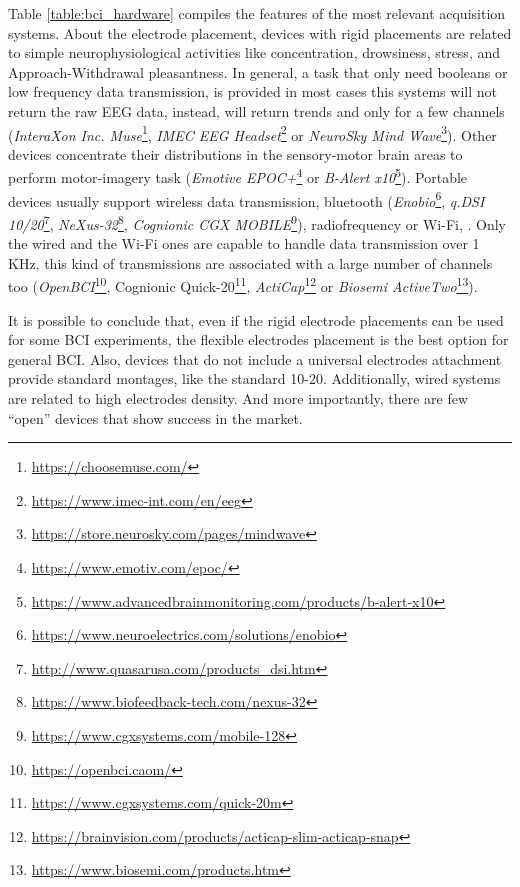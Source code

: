 Table \ref{table:bci_hardware} compiles the features of the most relevant acquisition systems. About the electrode placement, devices with rigid placements are related to simple neurophysiological activities like concentration, drowsiness, stress, and Approach-Withdrawal pleasantness. In general, a task that only need booleans or low frequency data transmission, is provided in most cases this systems will not return the raw \gls*{EEG} data, instead, will return trends and only for a few channels (\textit{InteraXon Inc. Muse}\footnote{\href{https://choosemuse.com/}{https://choosemuse.com/}}, \textit{IMEC EEG Headset}\footnote{\href{https://www.imec-int.com/en/eeg}{https://www.imec-int.com/en/eeg}} or \textit{NeuroSky Mind Wave}\footnote{\href{https://store.neurosky.com/pages/mindwave}{https://store.neurosky.com/pages/mindwave}}). Other devices concentrate their distributions in the sensory-motor brain areas to perform motor-imagery task (\textit{Emotive EPOC+}\footnote{\href{https://www.emotiv.com/epoc/}{https://www.emotiv.com/epoc/}} or \textit{B-Alert x10}\footnote{\href{https://www.advancedbrainmonitoring.com/products/b-alert-x10}{https://www.advancedbrainmonitoring.com/products/b-alert-x10}}). Portable devices usually support wireless data transmission, bluetooth  (\textit{Enobio}\footnote{\href{https://www.neuroelectrics.com/solutions/enobio}{https://www.neuroelectrics.com/solutions/enobio}}, \textit{q.DSI 10/20}\footnote{\href{http://www.quasarusa.com/products_dsi.htm}{http://www.quasarusa.com/products_dsi.htm}}, \textit{NeXus-32}\footnote{\href{https://www.biofeedback-tech.com/nexus-32}{https://www.biofeedback-tech.com/nexus-32}}, \textit{Cognionic CGX MOBILE}\footnote{\href{https://www.cgxsystems.com/mobile-128}{https://www.cgxsystems.com/mobile-128}}), radiofrequency or Wi-Fi, . Only the wired and the Wi-Fi ones are capable to handle data transmission over 1 KHz, this kind of transmissions are associated with a large number of channels too (\textit{OpenBCI}\footnote{\href{https://openbci.caom/}{https://openbci.caom/}}, Cognionic Quick-20\footnote{\href{https://www.cgxsystems.com/quick-20m}{https://www.cgxsystems.com/quick-20m}}, \textit{ActiCap}\footnote{\href{https://brainvision.com/products/acticap-slim-acticap-snap}{https://brainvision.com/products/acticap-slim-acticap-snap}} or \textit{Biosemi ActiveTwo}\footnote{\href{https://www.biosemi.com/products.htm}{https://www.biosemi.com/products.htm}}). 

It is possible to conclude that, even if the rigid electrode placements can be used for some \gls*{BCI} experiments, the flexible electrodes placement is the best option for general \gls*{BCI}. Also, devices that do not include a universal electrodes attachment provide standard montages, like the standard 10-20. Additionally, wired systems are related to high electrodes density. And more importantly, there are few “open” devices that show success in the market.


